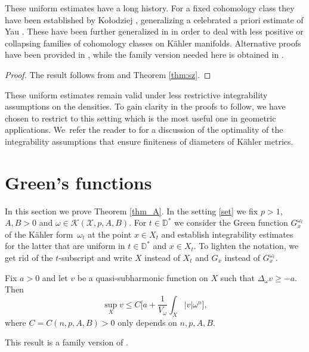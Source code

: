 These uniform estimates have a long history. For a fixed cohomology class they have been established by Ko{\l}odziej
\cite{Kol98}, generalizing a celebrated a priori estimate of Yau \cite{Yau78}.
These have been further generalized in \cite{EGZ09,EGZ08,DP10,BEGZ10} in order to deal with less positive or collapsing families of cohomology classes on Kähler manifolds. Alternative proofs have been provided in \cite{GL21,GPT23},
while the family version needed here is obtained in \cite{DnGG23}.

\begin{proof}
The result follows from \cite[Th.\,A]{DnGG23} and Theorem \ref{thm:sz}.
\end{proof}

These uniform estimates remain valid under less restrictive integrability assumptions on the densities.
To gain clarity in the proofs to follow, we have chosen to restrict to this setting which is the most useful one
in geometric applications. We~refer the reader to \cite[\S 5]{GGZ23} for a discussion of the optimality of the
integrability assumptions that ensure finiteness of diameters of Kähler metrics.

\section{Green's functions} \label{sec:uniformGreen}

In this section we prove Theorem \ref{thm_A}. In the setting \ref{set} we fix
$p>1$, $A,B>0$ and $\omega \in {\mathcal K}(\mathcal{X},p,A,B)$.
For $t \in {\mathbb D^*}$ we consider the Green function
$G^{\omega_t}_{x}$ of the Kähler form~$\omega_t$ at the point $x \in X_t$ and establish
integrability estimates for the latter that are uniform in $t \in {\mathbb D^*}$ and $x \in X_t$.
To lighten the notation, we get rid of the $t$-subscript and
write $X$ instead of $X_t$ and $G_x$ instead of $G^{\omega_t}_{x}$.


\begin{lem} \label{lem:5.1}
Fix $a>0$ and let $v$ be a quasi-subharmonic function on $X$ such that $\Delta_{\omega} v \geq -a$.
Then\vspace*{-3pt}
\[
\sup_X v \leq C \biggl[ a+ \frac{1}{V_{\omega}} \int_X |v| \omega^n \biggr],
\]
where $C=C(n,p,A,B)>0$ only depends on $n,p,A,B$.
\end{lem}

This result is a family version of \cite[Lem.\,5.1]{GPSS22}.

